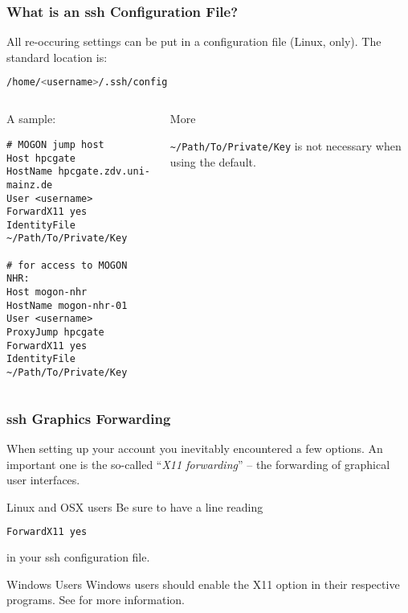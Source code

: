 \begin{frame}[fragile]
	\frametitle{What is an ssh Configuration File?}
	All re-occuring settings can be put in a configuration file (Linux, only). The standard location is:
	\begin{lstlisting}[language=Bash, style=Shell] 
/home/<username>/.ssh/config 
	\end{lstlisting}
	\begin{columns}
		\begin{column}{.5\textwidth}
			A sample:
			\begin{lstlisting}[basicstyle=\tiny] 
# MOGON jump host
Host hpcgate
HostName hpcgate.zdv.uni-mainz.de
User <username>    
ForwardX11 yes    
IdentityFile ~/Path/To/Private/Key

# for access to MOGON NHR:
Host mogon-nhr
HostName mogon-nhr-01
User <username>
ProxyJump hpcgate    
ForwardX11 yes    
IdentityFile ~/Path/To/Private/Key
			\end{lstlisting}
		\end{column}
		\begin{column}{.5\textwidth}
			More 
			\begin{hint}
				\texttt{\textasciitilde/Path/To/Private/Key} is not necessary when using the default.
			\end{hint}
		\end{column}
	\end{columns} 
\end{frame}

\begin{frame}[fragile]
	\frametitle{ssh Graphics Forwarding}
	When setting up your account you inevitably encountered a few options. An important one is the so-called ``\emph{X11 forwarding}'' -- the forwarding of graphical user interfaces.
	\pause
	\begin{exampleblock}{Linux and OSX users}
		Be sure to have a line reading 
		\begin{lstlisting}[language=Bash, style=Shell]
ForwardX11 yes
		\end{lstlisting}
		in your ssh configuration file.
	\end{exampleblock}
	\pause 
	\begin{exampleblock}{Windows Users}
		Windows users should enable the X11 option in their respective programs. See  for more information.
	\end{exampleblock}
\end{frame}


